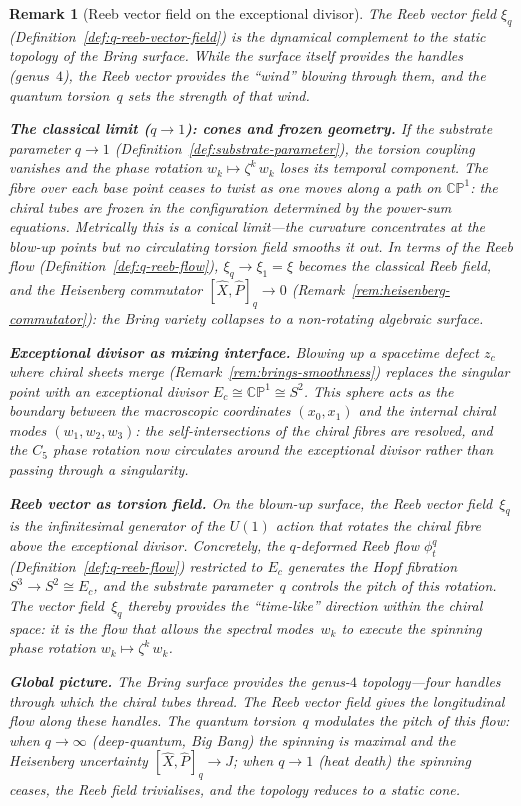 \documentclass[12pt,a4paper]{report}
\newtheorem{remark}[theorem]{Remark}
\begin{document}
\begin{remark}[Reeb vector field on the exceptional divisor]
\label{rem:reeb-exceptional-divisor}
The Reeb vector field $\xi_q$
(Definition~\ref{def:q-reeb-vector-field}) is the dynamical
complement to the static topology of the Bring surface.  While the
surface itself provides the handles (genus~$4$), the Reeb vector
provides the ``wind'' blowing through them, and the quantum torsion~$q$
sets the strength of that wind.

\medskip
\noindent\textbf{The classical limit ($q\to 1$): cones and frozen geometry.}\;
If the substrate parameter $q\to 1$
(Definition~\ref{def:substrate-parameter}), the
torsion coupling vanishes and the phase rotation
$w_k\mapsto\zeta^k\,w_k$ loses its temporal component.  The fibre
over each base point ceases to twist as one moves along a path on
$\mathbb{CP}^1$: the chiral tubes are frozen in the configuration
determined by the power-sum equations.  Metrically this is a conical
limit---the curvature concentrates at the blow-up points but no
circulating torsion field smooths it out.  In terms of the Reeb
flow (Definition~\ref{def:q-reeb-flow}), $\xi_q\to\xi_1=\xi$ becomes
the classical Reeb field, and the Heisenberg commutator
$[\hat{X},\hat{P}]_q\to 0$
(Remark~\ref{rem:heisenberg-commutator}): the Bring variety
collapses to a non-rotating algebraic surface.

\medskip
\noindent\textbf{Exceptional divisor as mixing interface.}\;
Blowing up a spacetime defect $z_c$ where chiral sheets merge
(Remark~\ref{rem:brings-smoothness}) replaces the singular point with
an exceptional divisor $E_c\cong\mathbb{CP}^1\cong S^2$.  This
sphere acts as the boundary between the macroscopic coordinates
$(x_0,x_1)$ and the internal chiral modes $(w_1,w_2,w_3)$: the
self-intersections of the chiral fibres are resolved, and the
$C_5$ phase rotation now circulates \emph{around} the exceptional
divisor rather than passing through a singularity.

\medskip
\noindent\textbf{Reeb vector as torsion field.}\;
On the blown-up surface, the Reeb vector field~$\xi_q$ is the
infinitesimal generator of the $U(1)$ action that rotates the chiral
fibre above the exceptional divisor.  Concretely, the
$q$-deformed Reeb flow $\phi_t^q$
(Definition~\ref{def:q-reeb-flow}) restricted to $E_c$ generates
the Hopf fibration $S^3\to S^2\cong E_c$, and the substrate
parameter~$q$ controls the pitch of this rotation.  The vector
field~$\xi_q$ thereby provides the ``time-like'' direction within the
chiral space: it is the flow that allows the spectral modes~$w_k$ to
execute the spinning phase rotation
$w_k\mapsto\zeta^k\,w_k$.

\medskip
\noindent\textbf{Global picture.}\;
The Bring surface provides the genus-$4$ topology---four handles
through which the chiral tubes thread.  The Reeb vector field gives
the longitudinal flow along these handles.  The quantum torsion~$q$
modulates the pitch of this flow: when $q\to\infty$ (deep-quantum,
Big Bang) the spinning is maximal and the Heisenberg uncertainty
$[\hat{X},\hat{P}]_q\to J$; when $q\to 1$ (heat death) the spinning
ceases, the Reeb field trivialises, and the topology reduces to a
static cone.
\end{remark}
\end{document}
